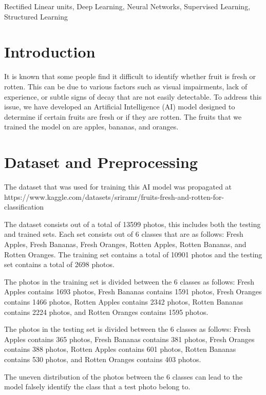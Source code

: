 \documentclass[conference]{IEEEtran}
\begin{document}
\begin{IEEEkeywords}
Rectified Linear units, Deep Learning,
Neural Networks, Supervised Learning, Structured Learning
\end{IEEEkeywords}

\section{Introduction}

It is known that some people find it difficult to identify whether fruit is fresh or rotten. This can be due to various factors such as visual impairments, lack of experience, or subtle signs of decay that are not easily detectable. To address this issue, we have developed an Artificial Intelligence (AI) model designed to determine if certain fruits are fresh or if they are rotten. The fruits that we trained the model on are apples, bananas, and oranges.

\section{Dataset and Preprocessing}

The dataset that was used for training this AI model was propagated at https://www.kaggle.com/datasets/sriramr/fruits-fresh-and-rotten-for-classification

The dataset consists out of a total of 13599 photos, this includes both the testing and trained sets. Each set consists out of 6 classes that are as follows: Fresh Apples, Fresh Bananas, Fresh Oranges, Rotten Apples, Rotten Bananas, and Rotten Oranges. The training set contains a total of 10901 photos and the testing set contains a total of 2698 photos.

The photos in the training set is divided between the 6 classes as follows: Fresh Apples contains 1693 photos, Fresh Bananas contains 1591 photos, Fresh Oranges contains 1466 photos, Rotten Apples contains 2342 photos, Rotten Bananas contains 2224 photos, and Rotten Oranges contains 1595 photos.

The photos in the testing set is divided between the 6 classes as follows: Fresh Apples contains 365 photos, Fresh Bananas contains 381 photos, Fresh Oranges contains 388 photos, Rotten Apples contains 601 photos, Rotten Bananas contains 530 photos, and Rotten Oranges contains 403 photos.

The uneven distribution of the photos between the 6 classes can lead to the model falsely identify the class that a test photo belong to.
\end{document}
